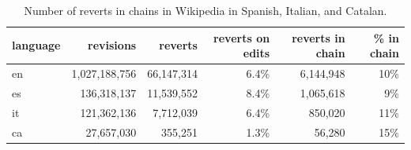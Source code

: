 \begin{table}[H]
    \centering
    \begin{tabularx}{\columnwidth}{@{}Xrrrrr@{}}
        \midrule
        \textbf{language}& \textbf{revisions} & \textbf{reverts} & \textbf{reverts on edits} & \textbf{reverts in chain} & \textbf{\% in chain} \\ \toprule
        en &1,027,188,756&66,147,314&6.4\%&6,144,948& 10\%\\
        es &136,318,137& 11,539,552&8.4\%& 1,065,618 & 9\% \\
        it &121,362,136& 7,712,039 &6.4\% & 850,020 &  11\% \\
        ca &27,657,030& 355,251 & 1.3\%& 56,280 & 15\% \\
    
        \bottomrule
    \end{tabularx}
    
    \caption{Number of reverts in chains in Wikipedia in Spanish, Italian, and Catalan. \label{table:generalstats}}
\end{table}


